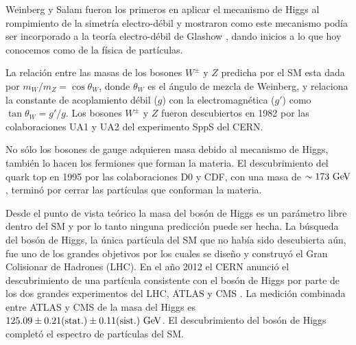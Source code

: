 Weinberg y Salam fueron los primeros en aplicar el mecanismo de Higgs al
rompimiento de la simetría electro-débil
\cite{PhysRevLett.19.1264,PhysRev.127.965} y mostraron como este mecanismo podía
ser incorporado a la teoría electro-débil de Glashow \cite{Glashow1961579}, dando
inicios a lo que hoy conocemos como {\SM} de la física de partículas.

La relación entre las masas de los bosones $W^\pm$ y $Z$ predicha por el SM esta
dada por $m_W/m_Z = \cos \theta_W$, donde $\theta_W$ es el ángulo de
mezcla de Weinberg, y relaciona la constante de acoplamiento débil ($g$) con la
electromagnética ($g'$) como $\tan\theta_W = g'/g$. Los bosones $W^\pm$ y $Z$
fueron descubiertos en 1982 por las colaboraciones UA1 y UA2 del experimento
SppS del CERN.

No sólo los bosones de gauge adquieren masa debido al mecanismo de Higgs,
también lo hacen los fermiones que forman la materia. El descubrimiento del
quark top en 1995 por las colaboraciones D0 y CDF, con una masa de $\sim 173
\GeV$, terminó por cerrar las partículas que conforman la materia.

Desde el punto de vista teórico la masa del bosón de Higgs es un parámetro libre
dentro del SM y por lo tanto ninguna predicción puede ser hecha. La búsqueda
del bosón de Higgs, la única partícula del SM que no había sido descubierta
aún, fue uno de los grandes objetivos por los cuales se dise\~no y construyó el
Gran Colisionar de Hadrones (LHC). En el a\~no 2012 el CERN anunció el
descubrimiento de una partícula consistente con el bosón de Higgs por parte de
los dos grandes experimentos del LHC, ATLAS y CMS
\cite{Aad:2012tfa,Chatrchyan:2012ufa}. La medición combinada entre ATLAS y CMS
de la masa del Higgs es $125.09 \pm 0.21 \text{(stat.)} \pm 0.11 \text{(sist.)}
\gev$. El descubrimiento del bosón de Higgs completó el espectro de partículas del SM.

